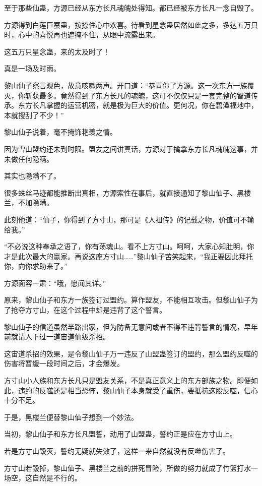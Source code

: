 \begin{this_body}
至于那些仙蛊，方源已经从东方长凡魂魄处得知。都已经被东方长凡一念自毁了。

方源得到白莲巨蚕蛊，按捺住心中欢喜。待看到星念蛊居然如此之多，多达五万只时，心中的喜悦再也遮掩不住，从眼中流露出来。

这五万只星念蛊，来的太及时了！

真是一场及时雨。

黎山仙子察言观色，故意咳嗽两声。开口道：“恭喜你了方源。这一次东方一族覆灭，你斩获最多。竟然得到了东方长凡的魂魄，这可不仅仅只是一套完整的智道传承。东方长凡掌握的运营机密，就是极为巨大的价值。更何况，你在碧潭福地中，本就搜刮了不少！”

黎山仙子说着，毫不掩饰艳羡之情。

因为雪山盟约还未到时限。盟友之间讲真话，方源对于擒拿东方长凡魂魄这事，并未做任何隐瞒。

其实也隐瞒不了。

很多蛛丝马迹都能推断出真相，方源索性在事后，就直接通知了黎山仙子、黑楼兰，不加隐瞒。

此刻他道：“仙子，你得到了方寸山，那可是《人祖传》的记载之物，价值可不输给我。”

“不必说这种奉承之语了，你有荡魂山。看不上方寸山。呵呵，大家心知肚明，你才是此次最大的赢家。再说这座方寸山……”黎山仙子苦笑起来，“我正要因此拜托你，向你求助来了。”

方源面容一肃：“哦，愿闻其详。”

原来，黎山仙子和东方一族签订过盟约。算作盟友，不能相互攻击。但黎山仙子为了抢夺方寸山，在这个过程中却是违背了这个誓言。

黎山仙子的信道虽然半路出家，但为防备无意间或者不得不违背誓言的情况，早年前就请人下过一道宙道仙级杀招。

这宙道杀招的效果，是令黎山仙子万一违反了山盟蛊签订的盟约，那么盟约反噬的伤害将暂缓一段时间之后，才会爆发。

方寸山小人族和东方长凡只是盟友关系，不是真正意义上的东方部族之物。即便如此，违约的反噬还是相当恐怖，黎山仙子本身就受了重伤，要抵抗这股反噬，信心十分不足。

于是，黑楼兰便替黎山仙子想到一个妙法。

当初，黎山仙子和东方长凡盟誓，动用了山盟蛊，誓约正是应在方寸山上。

若是方寸山毁灭，誓约无疑就失效了，这样一来自然就没有反噬伤害了。

方寸山若毁掉，黎山仙子、黑楼兰之前的拼死冒险，所做的努力就成了竹篮打水一场空，这自然是不行的。


\end{this_body}
